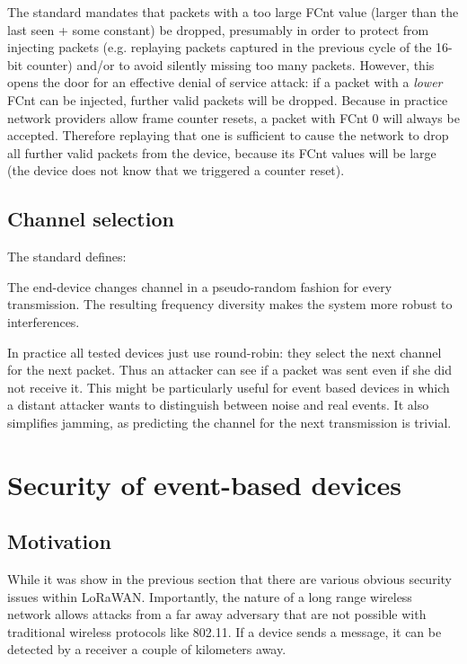 The standard mandates that packets with a too large FCnt value (larger than the last seen + some constant) be dropped, presumably in order to protect from injecting packets (e.g. replaying packets captured in the previous cycle of the 16-bit counter) and/or to avoid silently missing too many packets. However, this opens the door for an effective denial of service attack: if a packet with a \textit{lower} FCnt can be injected, further valid packets will be dropped. Because in practice network providers allow frame counter resets, a packet with FCnt 0 will always be accepted. Therefore replaying that one is sufficient to cause the network to drop all further valid packets from the device, because its FCnt values will be large (the device does not know that we triggered a counter reset).

\section{Channel selection}
\label{sec.channel}

The standard defines:

\begin{displayquote}
The end-device changes channel in a pseudo-random fashion for every
transmission. The resulting frequency diversity makes the system more
robust to interferences.
\end{displayquote}

In practice all tested devices just use round-robin: they select the next channel for the
next packet. Thus an attacker can see if a packet was sent even if she did not receive it.
This might be particularly useful for event based devices in which a distant
attacker wants to distinguish between noise and real events. It also simplifies jamming, as predicting the channel for the next transmission is trivial.

\hypertarget{h.1a3modh2fhpw}{\chapter{\texorpdfstring{{Security of
event-based
devices}}{Security of event-based devices}}\label{h.1a3modh2fhpw}}

\hypertarget{h.kyg6ihxrou88}{\section{\texorpdfstring{{Motivation}}{Motivation}}\label{h.kyg6ihxrou88}}

While it was show in the previous section that there are various
obvious security issues within LoRaWAN. Importantly, the nature of a long range
wireless network allows attacks from a far away adversary that are not
possible with traditional wireless protocols like 802.11. If a device
sends a message, it can be detected by a receiver a couple of kilometers away.


